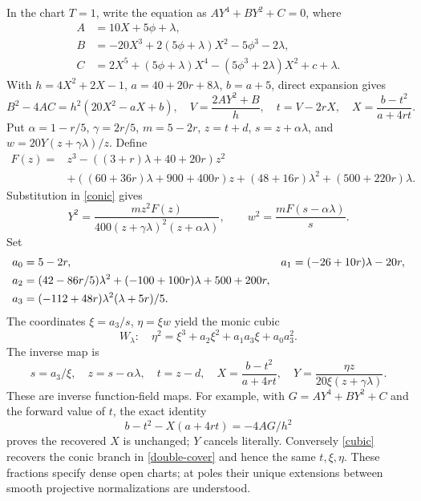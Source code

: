 \documentclass[11pt]{article}
\begin{document}
In the chart $T=1$, write the equation as $AY^4+BY^2+C=0$, where
\begin{align*}
A&=10X+5\phi+\lambda,\\
B&=-20X^3+2(5\phi+\lambda)X^2-5\phi^3-2\lambda,\\
C&=2X^5+(5\phi+\lambda)X^4-(5\phi^3+2\lambda)X^2+c+\lambda.
\end{align*}
With $h=4X^2+2X-1$, $a=40+20r+8\lambda$, $b=a+5$, direct expansion gives
\begin{equation}\label{conic}
B^2-4AC=h^2(20X^2-aX+b),\quad
V=\frac{2AY^2+B}{h},\quad t=V-2rX,\quad
X=\frac{b-t^2}{a+4rt}.
\end{equation}
Put $\alpha=1-r/5$, $\gamma=2r/5$, $m=5-2r$, $z=t+d$, $s=z+\alpha\lambda$,
and $w=20Y(z+\gamma\lambda)/z$. Define
\begin{align*}
F(z)={}&z^3-((3+r)\lambda+40+20r)z^2\\
 &+((60+36r)\lambda+900+400r)z
 +(48+16r)\lambda^2+(500+220r)\lambda.
\end{align*}
Substitution in \eqref{conic} gives
\begin{equation}\label{double-cover}
Y^2=\frac{mz^2F(z)}{400(z+\gamma\lambda)^2(z+\alpha\lambda)},
\qquad w^2=\frac{mF(s-\alpha\lambda)}s.
\end{equation}
Set
\begin{align}
a_0&=5-2r,& a_1&=(-26+10r)\lambda-20r,\notag\\
a_2&=(42-86r/5)\lambda^2+(-100+100r)\lambda+500+200r,\notag\\
a_3&=(-112+48r)\lambda^2(\lambda+5r)/5.\label{coefficients}
\end{align}
The coordinates $\xi=a_3/s$, $\eta=\xi w$ yield the monic cubic
\begin{equation}\label{cubic}
W_\lambda:\quad \eta^2=\xi^3+a_2\xi^2+a_1a_3\xi+a_0a_3^2.
\end{equation}
The inverse map is
\begin{equation}\label{inverse}
s=a_3/\xi,\quad z=s-\alpha\lambda,\quad t=z-d,\quad
X=\frac{b-t^2}{a+4rt},\quad
Y=\frac{\eta z}{20\xi(z+\gamma\lambda)}.
\end{equation}
These are inverse function-field maps. For example, with
$G=AY^4+BY^2+C$ and the forward value of $t$, the exact identity
\[
b-t^2-X(a+4rt)=-4AG/h^2
\]
proves the recovered $X$ is unchanged; $Y$ cancels literally. Conversely
\eqref{cubic} recovers the conic branch in \eqref{double-cover} and hence
the same $t,\xi,\eta$. These fractions specify dense open charts; at
poles their unique extensions between smooth projective normalizations
are understood.
\end{document}
